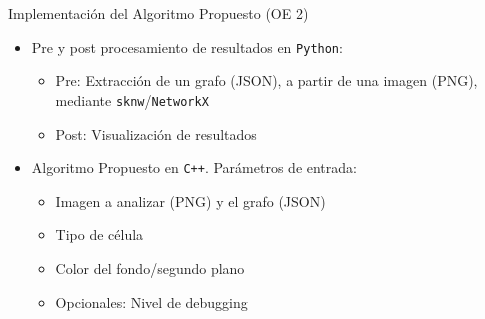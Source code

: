 \begin{frame}{Implementaci\'on del Algoritmo Propuesto (OE 2)}
    \begin{itemize}
        \item Pre y post procesamiento de resultados en {\tt Python}: 
        \begin{itemize}
            \item Pre: Extracci\'on de un grafo (JSON), a partir de una imagen (PNG),  mediante {\tt sknw}/{\tt NetworkX}
            \item Post: Visualizaci\'on de resultados
        \end{itemize}
        
        \item Algoritmo Propuesto en {\tt C++}. Par\'ametros de entrada:
        \begin{itemize}
            \item Imagen a analizar (PNG) y el grafo (JSON)
            \item Tipo de c\'elula
            \item Color del fondo/segundo plano
            \item Opcionales: Nivel de debugging
        \end{itemize}
        
        
    \end{itemize}
\end{frame}

